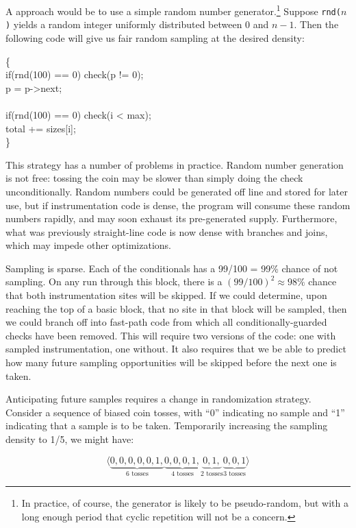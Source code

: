 A \naive approach would be to use a simple random number
generator.\footnote{In practice, of course, the generator is likely to
  be pseudo-random, but with a long enough period that cyclic
  repetition will not be a concern.}  Suppose \texttt{rnd($n$)} yields
a random integer uniformly distributed between 0 and $n-1$.  Then the
following code will give us fair random sampling at the desired
density:

\begin{code}
  \{\+ \\
  if(rnd(100) == 0) check(p != 0); \\
  \up p = p->next; \\
  \\
  if(rnd(100) == 0) check(i < max); \\
  \up total += sizes[i]; \\
  \<\}
\end{code}

This strategy has a number of problems in practice.  Random number
generation is not free: tossing the coin may be slower than simply
doing the check unconditionally.  Random numbers could be generated
off line and stored for later use, but if instrumentation code is
dense, the program will consume these random numbers rapidly, and may
soon exhaust its pre-generated supply.  Furthermore, what was
previously straight-line code is now dense with branches and joins,
which may impede other optimizations.

Sampling is sparse.  Each of the conditionals has a 99/100 = 99\%
chance of not sampling.  On any run through this block, there is a
$(99/100)^2 \approx 98\%$ chance that both instrumentation sites will
be skipped.  If we could determine, upon reaching the top of a basic
block, that no site in that block will be sampled, then we could
branch off into fast-path code from which all conditionally-guarded
checks have been removed.  This will require two versions of the code:
one with sampled instrumentation, one without.  It also requires that
we be able to predict how many future sampling opportunities will be
skipped before the next one is taken.

Anticipating future samples requires a change in randomization
strategy.  Consider a sequence of biased coin tosses, with ``0''
indicating no sample and ``1'' indicating that a sample is to be
taken.  Temporarily increasing the sampling density to 1/5, we might
have:

\begin{equation*}
  \langle
    \underbrace{0, 0, 0, 0, 0, 1,}_{\text{6 tosses}}
    \underbrace{0, 0, 0, 1,}_{\text{4 tosses}}
    \underbrace{0, 1,}_{\text{2 tosses}}
    \underbrace{0, 0, 1}_{\text{3 tosses}}
    \rangle
\end{equation*}

